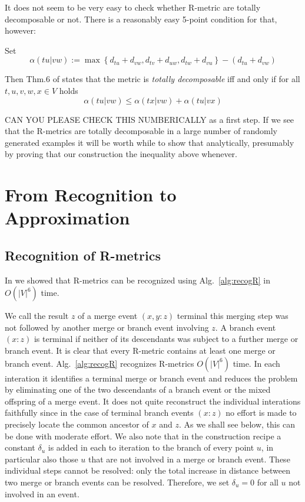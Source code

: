 \documentclass{article}
\newcommand{\TODO}[1]{\begingroup\color{red}#1\endgroup}
\begin{document}
\TODO{It does not seem to be very easy to check whether R-metric are 
totally decomposable or not. There is a reasonably easy 5-point condition
for that, however:

Set 
\begin{equation} 
  \alpha(tu|vw) := 
  \max\left\{ d_{tu}+d_{vw}, d_{tv}+d_{uw}, d_{tw}+d_{vu} \right\} -
             (d_{tu}+d_{vw})
\end{equation} 

Then Thm.6 of \cite{Bandelt:92} states that the metric is \emph{totally
  decomposable} iff and only if for all $t,u,v,w,x\in V$ holds 
\begin{equation} 
  \alpha(tu|vw) \le \alpha(tx|vw)+\alpha(tu|vx)
\end{equation} 

CAN YOU PLEASE CHECK THIS NUMBERICALLY as a first step. If we see that the 
R-metrics are totally decomposable in a large number of randomly generated
examples it will be worth while to show that analytically, presumably by 
proving that our construction the inequality above whenever.
}

\section{From Recognition to Approximation} 

\subsection{Recognition of R-metrics}

In \cite{Prohaska:17a} we showed that R-metrics can be recognized using
Alg.~\ref{alg:recogR} in $O(|V|^6)$ time.

We call the result $z$ of a merge event $(x,y:z)$ terminal this merging
step was not followed by another merge or branch event involving $z$. A
branch event $(x:z)$ is terminal if neither of its descendants was subject
to a further merge or branch event. It is clear that every R-metric
contains at least one merge or branch event. Alg.~\ref{alg:recogR}
\cite{Prohaska:17a} recognizes R-metrics $O(|V|^6)$ time. In each
interation it identifies a terminal merge or branch event and reduces the
problem by eliminating one of the two descendants of a branch event or the
mixed offspring of a merge event. It does not quite reconstruct the
individual interations faithfully since in the case of terminal branch
events $(x:z)$ no effort is made to precisely locate the common ancestor of
$x$ and $z$. As we shall see below, this can be done with moderate effort.
We also note that in the construction recipe a constant $\delta_u$ is added
in each to iteration to the branch of every point $u$, in particular also
those $u$ that are not involved in a merge or branch event. These
individual steps cannot be resolved: only the total increase in distance
between two merge or branch events can be resolved. Therefore, we set
$\delta_u=0$ for all $u$ not involved in an event. 
\end{document}
